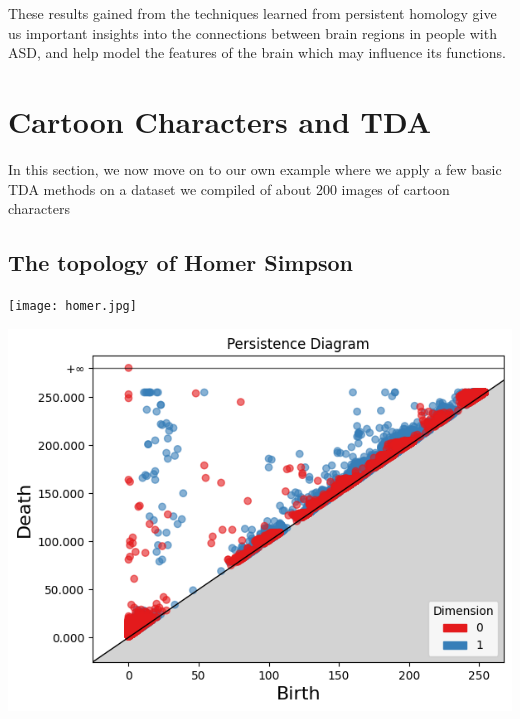 \documentclass[12pt]{exam}
\begin{document}
These results gained from the techniques learned from persistent homology give us important insights into the connections between brain regions in people with ASD, and help model the features of the brain which may influence its functions. 




\section{Cartoon Characters and TDA}

In this section, we now move on to our own example where we apply a few basic TDA methods on a dataset we compiled of about 200 images of cartoon characters


\subsection{The topology of Homer Simpson}

\begin{mdframed}
\centering
\begin{minipage}{0.18\linewidth}
    \centering
    \texttt{[image: homer.jpg]}
\end{minipage}
\hfill
\begin{minipage}{0.6\linewidth}
    \centering
    \includegraphics[width=\linewidth]{homer_pd.png}
\end{minipage}
\end{mdframed}
\end{document}
